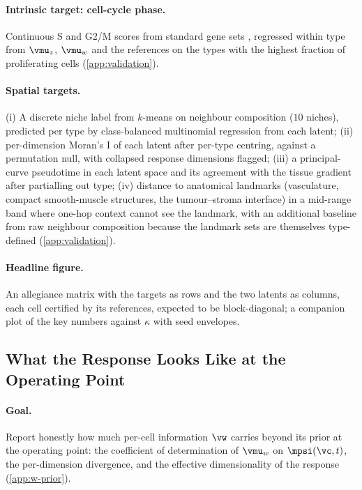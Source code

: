 \paragraph{Intrinsic target: cell-cycle phase.} Continuous S and G2/M scores from standard gene sets \citep{tirosh2016}, regressed within type from $\vmu_z$, $\vmu_w$ and the references on the types with the highest fraction of proliferating cells (\cref{app:validation}). 

\paragraph{Spatial targets.} (i) A discrete niche label from $k$-means on neighbour composition ($10$ niches), predicted per type by class-balanced multinomial regression from each latent; (ii) per-dimension Moran's I \citep{moran1950} of each latent after per-type centring, against a permutation null, with collapsed response dimensions flagged; (iii) a principal-curve pseudotime in each latent space and its agreement with the tissue gradient after partialling out type; (iv) distance to anatomical landmarks (vasculature, compact smooth-muscle structures, the tumour--stroma interface) in a mid-range band where one-hop context cannot see the landmark, with an additional baseline from raw neighbour composition because the landmark sets are themselves type-defined (\cref{app:validation}). 

\paragraph{Headline figure.}  An allegiance matrix with the targets as rows and the two latents as columns, each cell certified by its references, expected to be block-diagonal; a companion plot of the key numbers against $\kappa$ with seed envelopes.

\subsection{What the Response Looks Like at the Operating Point}
\label{sec:w-degeneracy}

\paragraph{Goal.} Report honestly how much per-cell information $\vw$ carries beyond its prior at the operating point: the coefficient of determination of $\vmu_w$ on $\mpsi(\vc, t)$, the per-dimension divergence, and the effective dimensionality of the response (\cref{app:w-prior}). 
